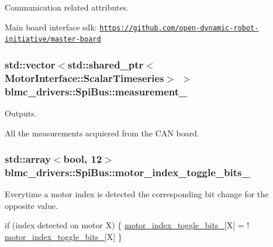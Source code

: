 Communication related attributes. 

Main board interface sdk\+: \href{https://github.com/open-dynamic-robot-initiative/master-board}{\tt https\+://github.\+com/open-\/dynamic-\/robot-\/initiative/master-\/board} 
\subsubsection[{\texorpdfstring{measurement\+\_\+}{measurement_}}]{\setlength{\rightskip}{0pt plus 5cm}std\+::vector$<$std\+::shared\+\_\+ptr$<${\bf Motor\+Interface\+::\+Scalar\+Timeseries}$>$ $>$ blmc\+\_\+drivers\+::\+Spi\+Bus\+::measurement\+\_\+\hspace{0.3cm}{\ttfamily [private]}}\hypertarget{classblmc__drivers_1_1SpiBus_ae3ad20f9cd7e06585b3af84697870cfa}{}\label{classblmc__drivers_1_1SpiBus_ae3ad20f9cd7e06585b3af84697870cfa}


Outputs. 

All the measurements acquiered from the C\+AN board. 
\subsubsection[{\texorpdfstring{motor\+\_\+index\+\_\+toggle\+\_\+bits\+\_\+}{motor_index_toggle_bits_}}]{\setlength{\rightskip}{0pt plus 5cm}std\+::array$<$bool, 12$>$ blmc\+\_\+drivers\+::\+Spi\+Bus\+::motor\+\_\+index\+\_\+toggle\+\_\+bits\+\_\+\hspace{0.3cm}{\ttfamily [private]}}\hypertarget{classblmc__drivers_1_1SpiBus_a5805dd95171df8f26efdae85ea02662c}{}\label{classblmc__drivers_1_1SpiBus_a5805dd95171df8f26efdae85ea02662c}


Everytime a motor index is detected the corresponding bit change for the opposite value. 


\begin{DoxyCode}
\textcolor{keywordflow}{if} (index detected on motor X)
\{
    \hyperlink{classblmc__drivers_1_1SpiBus_a5805dd95171df8f26efdae85ea02662c}{motor\_index\_toggle\_bits\_}[X] = !
      \hyperlink{classblmc__drivers_1_1SpiBus_a5805dd95171df8f26efdae85ea02662c}{motor\_index\_toggle\_bits\_}[X]
\}
\end{DoxyCode}
